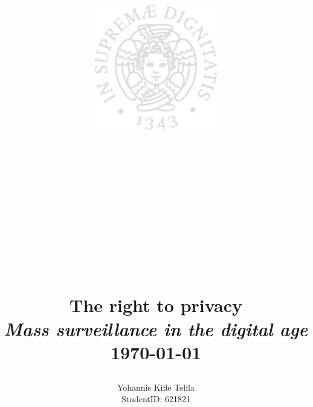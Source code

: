\documentclass[11pt]{report}
\begin{document}
\date{}

\title{ %
		\includegraphics[width=0.4\textwidth]{img/cherubino.eps}
		
		\\ \\ \\[0.2cm]
		 \\
	     \\
	    
	    \\[3cm]
	    \LARGE \textbf{The right to privacy \\} %
	    \textit{Mass surveillance in the digital age}
		 \\ [0.5cm]
		\normalsize \today \vspace*{5\baselineskip}}
		
\date{}

\author{
		Yohannis Kifle Telila  \\
		 StudentID: 621821 }
		 
\maketitle

\end{document}
